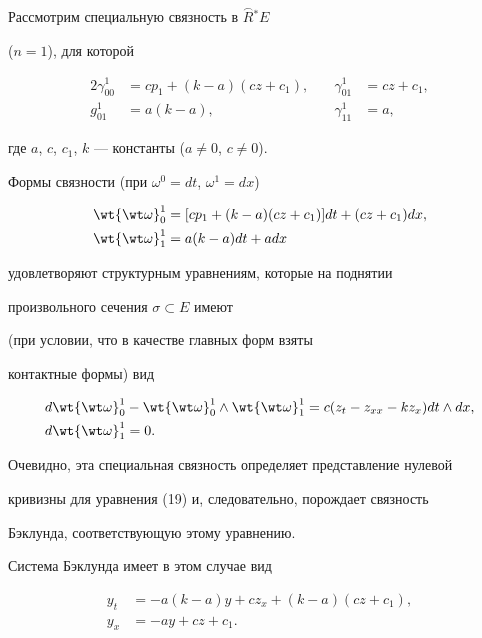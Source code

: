 \begin{exams}


Рассмотрим специальную связность в $\overset{\frown}{R}{}^*E$


(${n=1}$), для которой


\begin{alignat*}{2}


\gamma_{00}^1&=c p_1+({k-a}) ({cz+c_1}),& \quad


\gamma_{01}^1&=cz+c_1, \\


g_{01}^1&=a ({k-a}),& \quad \gamma_{11}^1&=a, 


\end{alignat*}


где $a$, $c$, $c_1$, $k$ --- константы ($a \ne 0$, $c \ne 0$).


Формы связности (при $\omega^0=dt$, $\omega^1=dx$)


\begin{align*}


{\wt {\wt \omega}_0^1}&=[ {c p_1+({k-a})


({cz+c_1})} ]dt+({cz+c_1})dx, \\


{\wt {\wt \omega}_1^1}&=a ({k-a})dt+adx 


\end{align*}


удовлетворяют структурным уравнениям, которые на поднятии 


произвольного сечения $\sigma \subset E$ имеют


(при условии, что в качестве главных форм взяты 


контактные формы) вид 


\begin{align*}


&d{\wt {\wt \omega}}_0^1-{\wt {\wt \omega}}_0^1


\wedge {\wt {\wt \omega}}_1^1=c ({z_t-z_{xx}-kz_x})dt \wedge dx, \\


&d{\wt {\wt \omega}}_1^1=0. 


\end{align*} 


Очевидно, эта специальная связность определяет представление нулевой 


кривизны для уравнения (19) и, следовательно, порождает связность 


Бэклунда, соответствующую этому уравнению.


Система Бэклунда имеет в этом случае вид


\begin{equation}


\begin{split}


y_t&=- a ({k-a})y+cz_x+({k-a}) ({cz+c_1}), \\


y_x&=- ay+cz+c_1. 


\end{split} 


\end{equation}


\end{exams}
